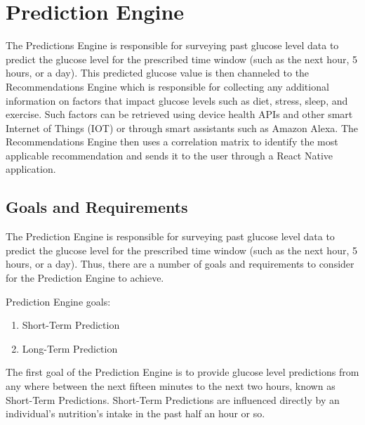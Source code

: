 


\section{Prediction Engine}
\label{sec:project_management}


\bigbreak
The Predictions Engine is responsible for surveying past glucose level data to predict the glucose level for the prescribed time window (such as the next hour, 5 hours, or a day). This predicted glucose value is then channeled to the Recommendations Engine which is responsible for collecting any additional information on factors that impact glucose levels such as diet, stress, sleep, and exercise. Such factors can be retrieved using device health APIs and other smart Internet of Things (IOT) or through smart assistants such as Amazon Alexa. The Recommendations Engine then uses a correlation matrix to identify the most applicable recommendation and sends it to the user through a React Native application.



\subsection{Goals and Requirements}
The Prediction Engine is responsible for surveying past glucose level data to predict the glucose level for the prescribed time window (such as the next hour, 5 hours, or a day). Thus, there are a number of goals and requirements to consider for the Prediction Engine to achieve. 

\bigbreak

Prediction Engine goals:
\begin{enumerate}
\item Short-Term Prediction
\item Long-Term Prediction
\end{enumerate}

The first goal of the Prediction Engine is to provide glucose level predictions from any where between the next fifteen minutes to the next two hours, known as Short-Term Predictions. Short-Term Predictions are influenced directly by an individual's nutrition's intake in the past half an hour or so. 

